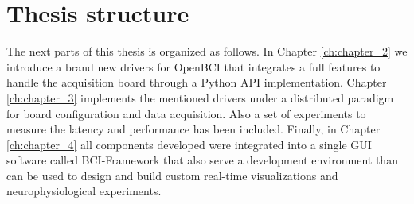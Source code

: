 \section{Thesis structure}

{\color {Nessa}
The next parts of this thesis is organized as follows.
In Chapter \ref{ch:chapter_2} we introduce a brand new drivers for OpenBCI that integrates a full features to handle the acquisition board through a Python API implementation. 
Chapter \ref{ch:chapter_3} implements the mentioned drivers under a distributed paradigm for board configuration and data acquisition. Also a set of experiments to measure the latency and performance has been included. 
Finally, in Chapter \ref{ch:chapter_4} all components developed were integrated into a single GUI software called BCI-Framework that also serve a development environment than can be used to design and build custom real-time visualizations and neurophysiological experiments. 
}